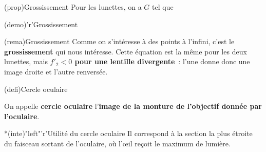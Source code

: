 \documentclass[../../main/main.tex]{subfiles}
\begin{document}
\begin{tcbraster}[raster columns=4, raster equal height=rows]
	\begin{tcb}[label=prop:gross_lunette](prop){Grossissement}
		Pour les lunettes, on a $G$ tel que
	\end{tcb}
	\begin{tcb}[label=demo:gross_lunette, raster multicolumn=3](demo)'r'{Grossissement}
	\end{tcb}
\end{tcbraster}
\begin{tcb}[label=rema:gross_lunette](rema){Grossissement}
	Comme on s'intéresse à des points à l'infini, c'est le \textbf{grossissement}
	qui nous intéresse. Cette équation est la même pour les deux lunettes, mais
	\textbf{$f'_2 < 0$ pour une lentille divergente}~: l'une donne donc une image
	droite et l'autre renversée.
\end{tcb}
\begin{tcbraster}[raster columns=2, raster equal height=rows]
	\begin{tcb}(defi){Cercle oculaire}

		On appelle \textbf{cercle oculaire} l'\textbf{image de la monture de
			l'objectif donnée par l'oculaire}.

	\end{tcb}
	\begin{tcb}*(inte)"left"'r'{Utilité du cercle oculaire}
		Il correspond à la section la plus étroite du faisceau sortant de
		l'oculaire, où l'œil reçoit le maximum de lumière.
	\end{tcb}
\end{tcbraster}
\end{document}
